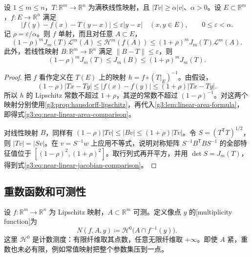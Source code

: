 \begin{lemma}\label{g3:lem:near-linear-area-comparison}
	设 \(1\le m\le n\)，\(T:\mathbb R^m\to\mathbb R^n\) 为满秩线性映射，且 \(|Tv|\ge\alpha|v|\)、\(\alpha>0\)。设 \(E\subset\mathbb R^m\)，\(f:E\to\mathbb R^n\) 满足
	\[
		|f(y)-f(x)-T(y-x)|\le\varepsilon|y-x|\quad(x,y\in E),\qquad 0\le\varepsilon<\alpha.
	\]
	记 \(\rho=\varepsilon/\alpha\)。则 \(f\) 单射，而且对任意 \(A\subset E\)，
	\begin{equation}\label{g3:eq:near-linear-area-comparison}
		(1-\rho)^mJ_m(T)\mathcal L^m(A)
		\le\mathcal H^m(f(A))
		\le(1+\rho)^mJ_m(T)\mathcal L^m(A).
	\end{equation}
	此外，若线性映射 \(B:\mathbb R^m\to\mathbb R^n\) 满足 \(\lVert B-T\rVert\le\varepsilon\)，则
	\begin{equation}\label{g3:eq:near-linear-jacobian-comparison}
		(1-\rho)^mJ_m(T)\le J_m(B)\le(1+\rho)^mJ_m(T).
	\end{equation}
\end{lemma}
\begin{proof}
	把 \(f\) 看作定义在 \(T(E)\) 上的映射 \(h=f\circ(T|_E)^{-1}\)。由假设，
	\[
		(1-\rho)|Tx-Ty|\le|f(x)-f(y)|\le(1+\rho)|Tx-Ty|.
	\]
	所以 \(h\) 的 Lipschitz 常数不超过 \(1+\rho\)，其逆的常数不超过 \((1-\rho)^{-1}\)。对这两个映射分别使用\cref{g3:prop:hausdorff-lipschitz}，再代入\cref{g3:lem:linear-area-formula}，即得式\eqref{g3:eq:near-linear-area-comparison}。

	对线性映射 \(B\)，同样有 \((1-\rho)|Tv|\le|Bv|\le(1+\rho)|Tv|\)。令 \(S=(T^{\mathsf T}T)^{1/2}\)，则 \(|Tv|=|Sv|\)。在 \(v=S^{-1}w\) 上应用不等式，说明对称矩阵 \(S^{-1}B^{\mathsf T}BS^{-1}\) 的全部特征值位于 \([(1-\rho)^2,(1+\rho)^2]\)。取行列式再开平方，并用 \(\det S=J_m(T)\)，得到式\eqref{g3:eq:near-linear-jacobian-comparison}。
\end{proof}

\subsection{重数函数和可测性}
\label{g3:subsec:2003:02}
设 \(f:\mathbb R^m\to\mathbb R^n\) 为 Lipschitz 映射，\(A\subset\mathbb R^m\) 可测。定义像点 \(y\) 的[multiplicity function]为
\[
	N(f,A,y)\coloneqq\mathcal H^0\bigl(A\cap f^{-1}(y)\bigr).
\]
这里 \(\mathcal H^0\) 是计数测度：有限纤维取其点数，任意无限纤维取 \(+\infty\)。即使 \(A\) 紧，重数也未必有限，例如常值映射把整个参数集压到一点。

